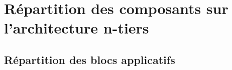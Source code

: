

\section{Répartition des composants sur l'architecture n-tiers}

\subsection{Répartition des blocs applicatifs}

